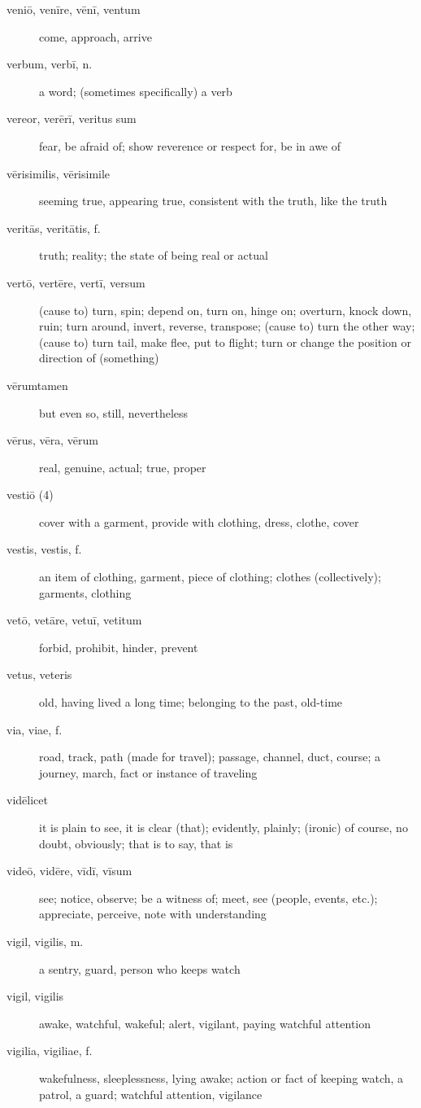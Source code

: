 \begin{description}
    \item[veniō, venīre, vēnī, ventum] come, approach, arrive
    \item[verbum, verbī, n.] a word; (sometimes specifically) a verb
    \item[vereor, verērī, veritus sum] fear, be afraid of; show reverence or respect for, be in awe of
    \item[vērisimilis, vērisimile] seeming true, appearing true, consistent with the truth, like the truth
    \item[veritās, veritātis, f.] truth; reality; the state of being real or actual
    \item[vertō, vertēre, vertī, versum] (cause to) turn, spin; depend on, turn on, hinge on; overturn, knock down, ruin; turn around, invert, reverse, transpose; (cause to) turn the other way; (cause to) turn tail, make flee, put to flight; turn or change the position or direction of (something)
    \item[vērumtamen] but even so, still, nevertheless
    \item[vērus, vēra, vērum] real, genuine, actual; true, proper
    \item[vestiō (4)] cover with a garment, provide with clothing, dress, clothe, cover
    \item[vestis, vestis, f.] an item of clothing, garment, piece of clothing; clothes (collectively); garments, clothing
    \item[vetō, vetāre, vetuī, vetitum] forbid, prohibit, hinder, prevent
    \item[vetus, veteris] old, having lived a long time; belonging to the past, old-time
    \item[via, viae, f.] road, track, path (made for travel); passage, channel, duct, course; a journey, march, fact or instance of traveling
    \item[vidēlicet] it is plain to see, it is clear (that); evidently, plainly; (ironic) of course, no doubt, obviously; that is to say, that is
    \item[videō, vidēre, vīdī, vīsum] see; notice, observe; be a witness of; meet, see (people, events, etc.); appreciate, perceive, note with understanding
    \item[vigil, vigilis, m.] a sentry, guard, person who keeps watch
    \item[vigil, vigilis] awake, watchful, wakeful; alert, vigilant, paying watchful attention
    \item[vigilia, vigiliae, f.] wakefulness, sleeplessness, lying awake; action or fact of keeping watch, a patrol, a guard; watchful attention, vigilance

\end{description}
